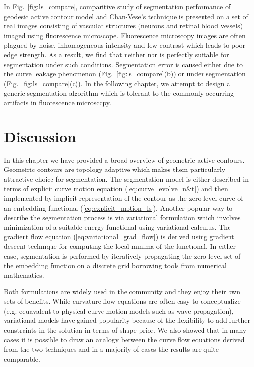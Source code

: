 In Fig.~\ref{fig:ls_compare}, comparitive study of segmentation performance of geodesic active contour model and Chan-Vese's technique is presented on a set of real images consisting of vascular structures (neurons and retinal blood vessels) imaged using fluorescence microscope. Fluorescence microscopy images are often plagued by noise, inhomogeneous intensity and low contrast which leads to poor edge strength. 
As a result, we find that neither \cite{caselles_geodesic} nor \cite{chan_vese} is perfectly suitable for segmentation under such conditions. Segmentation error is caused either due to the curve leakage phenomenon (Fig.~\ref{fig:ls_compare}(b)) or under segmentation (Fig.~\ref{fig:ls_compare}(c)). In the following chapter, we attempt to design a generic segmentation algorithm which is tolerant to the commonly occurring artifacts in fluorescence microscopy.

\section{Discussion} 
In this chapter we have provided a broad overview of geometric active contours. Geometric contours are topology adaptive which makes them particularly attractive choice for segmentation. The segmentation model is either described in terms of explicit curve motion equation (\ref{eq:curve_evolve_n&t}) and then implemented by implicit representation of the contour as the zero level curve of an embedding functional (\ref{eq:explicit_motion_ls}). Another popular way to describe the segmentation process is via variational formulation which involves minimization of a suitable energy functional using variational calculus. The gradient flow equation (\ref{eq:variational_grad_flow}) is derived using gradient descent technique for computing the local minima of the functional. In either case, segmentation is performed by iteratively propagating the zero level set of the embedding function on a discrete grid borrowing tools from numerical mathematics.

Both formulations are widely used in the community and they enjoy their own sets of benefits. While curvature flow equations are often easy to conceptualize (e.g. equavalent to physical curve motion models such as wave propagation), variational models have gained popularity because of the flexibility to add further constraints in the solution in terms of shape prior. We also showed that in many cases it is possible to draw an analogy between the curve flow equations derived from the two techniques and in a majority of cases the results are quite comparable.

